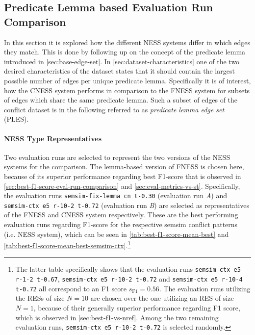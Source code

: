 \documentclass[11pt]{scrreprt}
\begin{document}
\subsection{Predicate Lemma based Evaluation Run Comparison}
In this section it is explored how the different NESS systems differ in which edges they match. This is done by following up on the concept of the predicate lemma introduced in \cref{sec:base-edge-set}. In \cref{sec:dataset-characteristics} one of the two desired characteristics of the dataset states that it should contain the largest possible number of edges per unique predicate lemma. Specifically it is of interest, how the CNESS system performs in comparison to the FNESS system for subsets of edges which share the same predicate lemma. Such a subset of edges of the conflict dataset is in the following referred to as \textit{predicate lemma edge set} (PLES).


\paragraph{NESS Type Representatives}
Two evaluation runs are selected to represent the two versions of the NESS systems for the comparison. The lemma-based version of FNESS is chosen here, because of its superior performance regarding best F1-score that is observed in \cref{sec:best-f1-score-eval-run-comparison} and \cref{sec:eval-metrics-vs-st}. Specifically, the evaluation runs \texttt{semsim-fix-lemma cn t-0.30} (evaluation run \textit{A}) and \texttt{semsim-ctx e5 r-10-2 t-0.72} (evaluation run \textit{B}) are selected as representatives of the FNESS and CNESS system respectively. These are the best performing evaluation runs regarding F1-score for the respective semsim conflict patterns (i.e. NESS system), which can be seen in \cref{tab:best-f1-score-mean-best} and \cref{tab:best-f1-score-mean-best-semsim-ctx}.\footnote{
The latter table specifically shows that the evaluation runs \texttt{semsim-ctx e5 r-1-2 t-0.67}, \texttt{semsim-ctx e5 r-10-2 t-0.72} and \texttt{semsim-ctx e5 r-10-4 t-0.72} all correspond to an F1 score \(s_\text{F1} = 0.56\). The evaluation runs utilizing the RESs of size \(N = 10\) are chosen over the one utilizing an RES of size \(N = 1\), because of their generally superior performance regarding F1 score, which is observed in \cref{sec:best-f1-vs-nref}. Among the two remaining evaluation runs, \texttt{semsim-ctx e5 r-10-2 t-0.72} is selected randomly.



}
\end{document}
